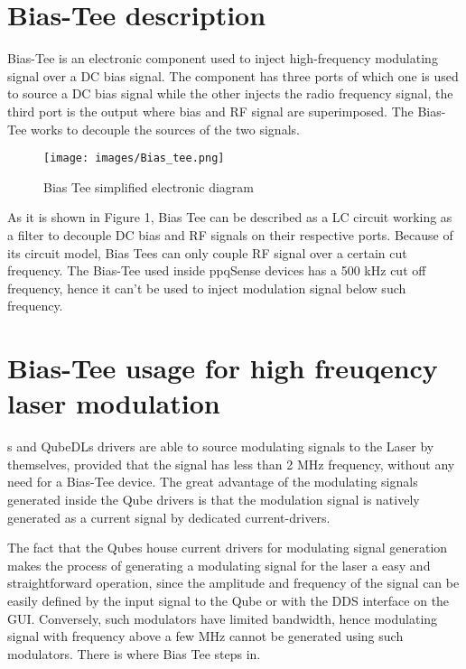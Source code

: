 \section{Bias-Tee description}
Bias-Tee is an electronic component used to inject high-frequency modulating signal over a DC bias signal. The component has three ports of which one is used to source a DC bias signal while the other injects the radio frequency signal, the third port is the output where bias and RF signal are superimposed. The Bias-Tee works to decouple the sources of the two signals.

\begin{figure}[H]
\centering
\texttt{[image: images/Bias\_tee.png]}
\caption{Bias Tee simplified electronic diagram}
\end{figure}

As it is shown in Figure 1, Bias Tee can be described as a LC circuit working as a filter to decouple DC bias and RF signals on their respective ports.
Because of its circuit model, Bias Tees can only couple RF signal over a certain cut frequency.
\newline The Bias-Tee used inside ppqSense devices has a 500 kHz cut off frequency, hence it can't be used to inject modulation signal below such frequency.





\section{Bias-Tee usage for high freuqency laser modulation}
\QubeModel s and QubeDLs drivers are able to source modulating signals to the Laser by themselves, provided that the signal has less than 2 MHz frequency, without any need for a Bias-Tee device. The great advantage of the modulating signals generated inside the Qube drivers is that the modulation signal is natively generated as a current signal by dedicated current-drivers. \newline

\newline The fact that the Qubes house current drivers for modulating signal generation makes the process of generating a modulating signal for the laser a easy and straightforward operation, since the amplitude and frequency of the signal can be easily defined by the input signal to the Qube or with the DDS interface on the GUI.
\newline Conversely, such modulators have limited bandwidth, hence modulating signal with frequency above a few MHz cannot be generated using such modulators. There is where Bias Tee steps in. \newline

